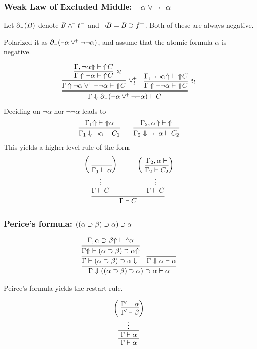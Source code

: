 \documentclass[9pt]{beamer}
\begin{document}
\begin{frame}
\frametitle{Weak Law of Excluded Middle: $\neg \alpha\vee\neg\neg\alpha$}

Let $\partial_{\scriptscriptstyle -}(B)$ denote $B\wedge^{\!-}t^-$ and $\neg B=B\supset f^+$.
Both of these are always negative.

Polarized it as $\partial_{\scriptscriptstyle -}(\neg \alpha \vee^{\!+} \neg\neg \alpha)$, and assume
that the atomic formula $\alpha$ is negative.

\[
  \infer=
        {\jLf{\Gamma}{\negd{\neg \alpha \veep \neg\neg \alpha}}{C}}
        {\infer[\veep_l]
               {\jUnf{\Gamma}{\neg \alpha \veep \neg\neg \alpha}{}{C}}
               {\infer[\kstore_l]
                      {\jUnf{\Gamma}{\neg \alpha}{}{C}}
                      {\jUnf{\Gamma,\neg \alpha}{}{}{C}}}
  &
  \infer[\kstore_l]
        {\jUnf{\Gamma}{\neg\neg \alpha}{}{C}}
        {\jUnf{\Gamma,\neg\neg \alpha}{}{}{C}}}
\]
Deciding on $\neg\alpha$ nor $\neg\neg\alpha$ leads to 
\[
  \infer={\jLf{\Gamma_1}{\neg \alpha}{C_1}}
         {\jUnf{\Gamma_1}{}{}{\alpha}}
  \qquad
  \infer={\jLf{\Gamma_2}{\neg\neg \alpha}{C_2}}
         {\jUnf{\Gamma_2,\alpha}{}{}{}}
\]
This yields a higher-level rule of the form
\[
\infer{\Gamma\vdash C}
      {\deduce{\Gamma\vdash C\strut}
              {\deduce{\vdots}
                      {\left(~\vcenter{
                        \infer{\Gamma_1\vdash \alpha}{\strut}
                        }\right)}}
       \quad&\quad
       \deduce{\Gamma\vdash C\strut}
              {\deduce{\vdots}
                      {\left(~\vcenter{
                        \infer{\Gamma_2\vdash C_2}
                                   {\deduce{\Gamma_2,\alpha\vdash }{}}
                       }\right)}}}
\]


\end{frame}

\begin{frame}
\frametitle{Perice's formula: $((\alpha\supset\beta)\supset\alpha)\supset\alpha$}

\[
  \infer{\jLf{\Gamma}{((\alpha\impl\beta)\impl\alpha)\impl\alpha}{\alpha}}
        {\infer{\jRf{\Gamma}{(\alpha\impl\beta)\impl\alpha}}
               {\infer={\jUnf{\Gamma}{}{(\alpha\impl\beta)\impl\alpha}{}}
                       {\jUnf{\Gamma,\alpha\impl\beta}{}{}{\alpha}}}
         &
         \infer{\jLf{\Gamma}{\alpha}{}{\alpha}}{}}
\]

Peirce's formula yields the restart rule.

\[
  \infer{\Gamma\vdash \alpha}
        {\infer{~\Gamma\vdash \alpha~}
               {\deduce{\vdots}{
                \left(~\vcenter{
                         \infer{\Gamma'\vdash\beta}
                               {\Gamma'\vdash\alpha}}
                \right)}}}
\]

\end{frame}
\end{document}
